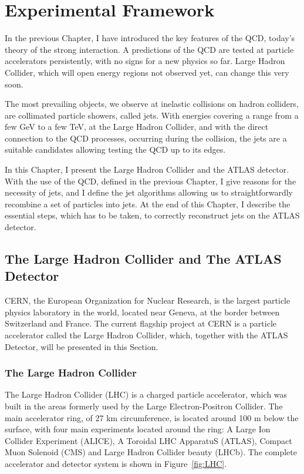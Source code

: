 \chapter{Experimental Framework}


In the previous Chapter, I have introduced the key features of the QCD, today's
theory of the strong interaction. A predictions of the QCD are tested at particle
accelerators persistently, with no signs for a new physics so far. 
Large Hadron Collider, which will open energy regions not observed yet, can
change this very soon.

The most prevailing objects, we observe at inelastic collisions on hadron
colliders, are collimated particle showers, called jets. With energies covering
a range from a few GeV to a few TeV, at the Large Hadron Collider, and with the
direct connection to the QCD processes, occurring during the collision, the jets
are a suitable candidates allowing testing the QCD up to its edges.

In this Chapter, I present the Large Hadron Collider and the ATLAS detector.
With the use of the QCD, defined in the previous Chapter, I give reasons for the
necessity of jets, and I define the jet algorithms allowing us to
straightforwardly recombine a
set of particles into jets. At the end of this Chapter, I describe the essential
steps, which has to be taken, to correctly reconstruct jets on the ATLAS
detector.

\section{The Large Hadron Collider and The ATLAS Detector}

CERN, the European Organization for Nuclear Research, is the largest particle
physics laboratory in the world, located near Geneva, at the border between
Switzerland and France. The current flagship project at CERN is a particle
accelerator called the Large Hadron Collider, which, together with the
ATLAS Detector, will be presented in this Section.

\subsection{The Large Hadron Collider}

The Large Hadron Collider (LHC) \cite{LHC, LHCPastPresentFuture} is a charged
particle accelerator, which was built in the areas formerly used by the Large
Electron-Positron Collider.  The main accelerator ring, of 27 km circumference,
is located around 100 m below the surface, with four main experiments located
around the ring: A Large Ion Collider Experiment (ALICE), A Toroidal LHC
ApparatuS (ATLAS), Compact Muon Solenoid (CMS) and Large Hadron Collider beauty
(LHCb). The complete accelerator and detector system is shown in
Figure~\ref{fig:LHC}.

